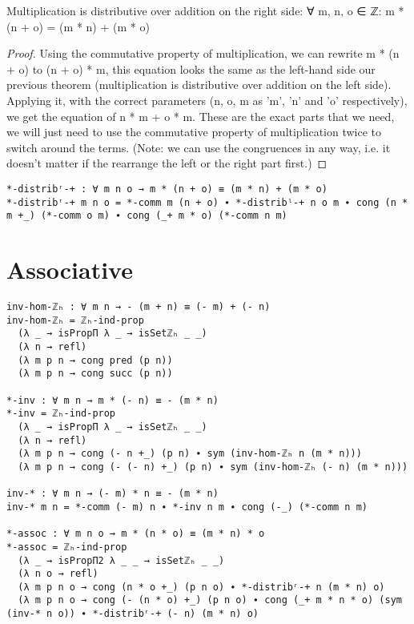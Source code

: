 \begin{theorem}
  Multiplication is distributive over addition on the right side: ∀ m, n, o ∈ ℤ: m * (n + o) = (m * n) + (m * o)
\end{theorem}

\begin{proof}
  Using the commutative property of multiplication, we can rewrite m * (n + o) to (n + o) * m, this equation looks the same as the left-hand side our previous theorem (multiplication is distributive over addition on the left side). Applying it, with the correct parameters (n, o, m as 'm', 'n' and 'o' respectively), we get the equation of n * m + o * m. These are the exact parts that we need, we will just need to use the commutative property of multiplication twice to switch around the terms. (Note: we can use the congruences in any way, i.e. it doesn't matter if the rearrange the left or the right part first.)
\end{proof}

\begin{listing}[H]
\begin{verbatim}
*-distribʳ-+ : ∀ m n o → m * (n + o) ≡ (m * n) + (m * o)
*-distribʳ-+ m n o = *-comm m (n + o) ∙ *-distribˡ-+ n o m ∙ cong (n * m +_) (*-comm o m) ∙ cong (_+ m * o) (*-comm n m)
\end{verbatim}
\caption{Agda proof of multiplication being right distributive to addition}
\end{listing}

\section{Associative}
\begin{verbatim}
inv-hom-ℤₕ : ∀ m n → - (m + n) ≡ (- m) + (- n)
inv-hom-ℤₕ = ℤₕ-ind-prop
  (λ _ → isPropΠ λ _ → isSetℤₕ _ _)
  (λ n → refl)
  (λ m p n → cong pred (p n))
  (λ m p n → cong succ (p n))

*-inv : ∀ m n → m * (- n) ≡ - (m * n)
*-inv = ℤₕ-ind-prop
  (λ _ → isPropΠ λ _ → isSetℤₕ _ _)
  (λ n → refl)
  (λ m p n → cong (- n +_) (p n) ∙ sym (inv-hom-ℤₕ n (m * n)))
  (λ m p n → cong (- (- n) +_) (p n) ∙ sym (inv-hom-ℤₕ (- n) (m * n)))

inv-* : ∀ m n → (- m) * n ≡ - (m * n)
inv-* m n = *-comm (- m) n ∙ *-inv n m ∙ cong (-_) (*-comm n m)

*-assoc : ∀ m n o → m * (n * o) ≡ (m * n) * o
*-assoc = ℤₕ-ind-prop
  (λ _ → isPropΠ2 λ _ _ → isSetℤₕ _ _)
  (λ n o → refl)
  (λ m p n o → cong (n * o +_) (p n o) ∙ *-distribʳ-+ n (m * n) o)
  (λ m p n o → cong (- (n * o) +_) (p n o) ∙ cong (_+ m * n * o) (sym (inv-* n o)) ∙ *-distribʳ-+ (- n) (m * n) o)
\end{verbatim}
